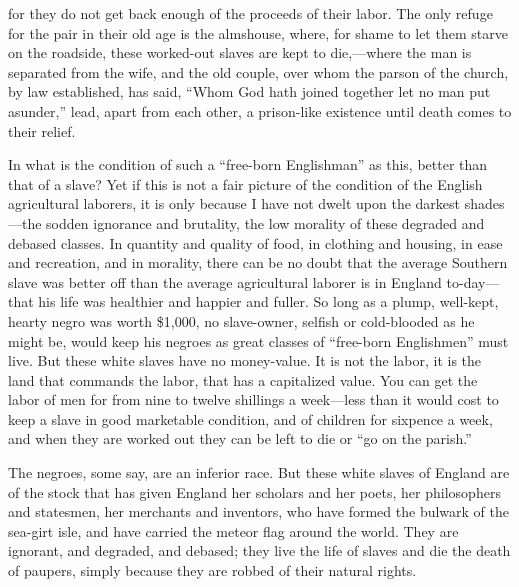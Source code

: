 \documentclass{book}
\begin{document}
for they do not get back enough of the proceeds of their labor. The only refuge for the pair in their old age is the almshouse, where, for shame to let them starve on the roadside, these worked-out slaves are kept to die,—where the man is separated from the wife, and the old couple, over whom the parson of the church, by law established, has said, “Whom God hath joined together let no man put asunder,” lead, apart from each other, a prison-like existence until death comes to their relief.

In what is the condition of such a “free-born Englishman” as this, better than that of a slave? Yet if this is not a fair picture of the condition of the English agricultural laborers, it is only because I have not dwelt upon the darkest shades—the sodden ignorance and brutality, the low morality of these degraded and debased classes. In quantity and quality of food, in clothing and housing, in ease and recreation, and in morality, there can be no doubt that the average Southern slave was better off than the average agricultural laborer is in England to-day—that his life was healthier and happier and fuller. So long as a plump, well-kept, hearty negro was worth \$1,000, no slave-owner, selfish or cold-blooded as he might be, would keep his negroes as great classes of “free-born Englishmen” must live. But these white slaves have no money-value. It is not the labor, it is the land that commands the labor, that has a capitalized value. You can get the labor of men for from nine to twelve shillings a week—less than it would cost to keep a slave in good marketable condition, and of children for sixpence a week, and when they are worked out they can be left to die or “go on the parish.”

The negroes, some say, are an inferior race. But these white slaves of England are of the stock that has given England her scholars and her poets, her philosophers and statesmen, her merchants and inventors, who have formed the bulwark of the sea-girt isle, and have carried the meteor flag around the world. They are ignorant, and degraded, and debased; they live the life of slaves and die the death of paupers, simply because they are robbed of their natural rights.
\end{document}
